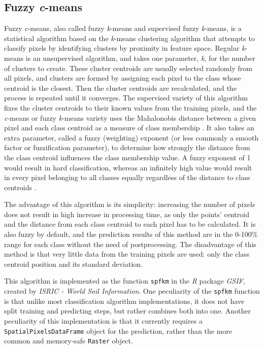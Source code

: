 \documentclass[a4paper,10pt]{book}
\begin{document}
\subsection{Fuzzy \textit{c}-means}

Fuzzy \textit{c}-means, also called fuzzy \textit{k}-means and supervised fuzzy \textit{k}-means, is a statistical algorithm based on the \textit{k}-means clustering algorithm that attempts to classify pixels by identifying clusters by proximity in feature space. Regular \textit{k}-means is an unsupervised algorithm, and takes one parameter, \textit{k}, for the number of clusters to create. These cluster centroids are usually selected randomly from all pixels, and clusters are formed by assigning each pixel to the class whose centroid is the closest. Then the cluster centroids are recalculated, and the process is repeated until it converges. The supervised variety of this algorithm fixes the cluster centroids to their known values from the training pixels, and the \textit{c}-means or fuzzy \textit{k}-means variety uses the Mahalonobis distance between a given pixel and each class centroid as a measure of class membership \citep{hengl2004fuzzycmeans}. It also takes an extra parameter, called a fuzzy (weighting) exponent (or less commonly a smooth factor or fuzzification parameter), to determine how strongly the distance from the class centroid influences the class membership value. A fuzzy exponent of 1 would result in hard classification, whereas an infinitely high value would result in every pixel belonging to all classes equally regardless of the distance to class centroids \citep{Okeke2006fuzzyexponent}.

The advantage of this algorithm is its simplicity: increasing the number of pixels does not result in high increase in processing time, as only the points' centroid and the distance from each class centroid to each pixel has to be calculated. It is also fuzzy by default, and the prediction results of this method are in the 0-100\% range for each class without the need of postprocessing. The disadvantage of this method is that very little data from the training pixels are used: only the class centroid position and its standard deviation.

This algorithm is implemented as the function \texttt{spfkm} in the \textit{R} package \textit{GSIF}, created by \textit{ISRIC - World Soil Information}. One peculiarity of the \texttt{spfkm} function is that unlike most classification algorithm implementations, it does not have split training and predicting steps, but rather combines both into one. Another peculiarity of this implementation is that it currently requires a \texttt{SpatialPixelsDataFrame} object for the prediction, rather than the more common and memory-safe \texttt{Raster} object.
\end{document}
